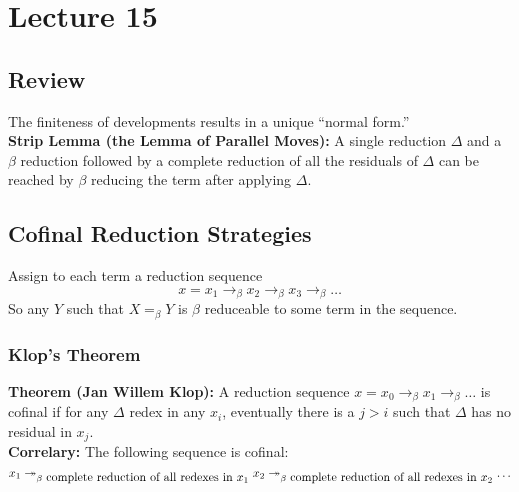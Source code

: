 \chapter{Lecture 15}

\section{Review}
The finiteness of developments results in a unique ``normal form.''\\

\textbf{Strip Lemma (the Lemma of Parallel Moves):} A single reduction $\Delta$ and a $\beta$ reduction followed by a complete reduction of all the residuals of $\Delta$ can be reached by $\beta$ reducing the term after applying $\Delta$.

\section{Cofinal Reduction Strategies}
Assign to each term a reduction sequence
\begin{equation*}
  x = x_1 \rightarrow_\beta x_2 \rightarrow_\beta x_3 \rightarrow_\beta \ldots
\end{equation*}
So any $Y$ such that $X =_\beta Y$ is $\beta$ reduceable to some term in the sequence.\\

\subsection{Klop's Theorem}
\textbf{Theorem (Jan Willem Klop):} A reduction sequence $x = x_0 \rightarrow_\beta x_1 \rightarrow_\beta \ldots$ is cofinal if for any $\Delta$ redex in any $x_i$, eventually there is a $j > i$ such that $\Delta$ has no residual in $x_j$.\\

\textbf{Correlary:} The following sequence is cofinal:
\begin{equation*}
  x_1 \twoheadrightarrow_{\beta\hbox{ complete reduction of all redexes in $x_1$}} x_2 \twoheadrightarrow_{\beta\hbox{ complete reduction of all redexes in $x_2$}} \ldots
\end{equation*}

